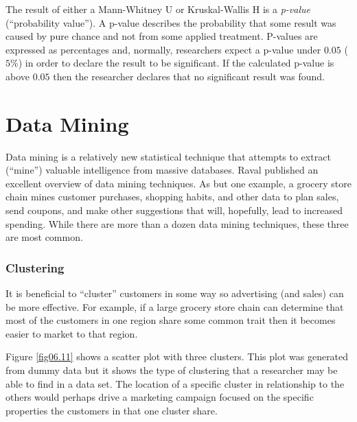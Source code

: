 The result of either a Mann-Whitney U or Kruskal-Wallis H is a \textit{p-value} (``probability value''). A p-value describes the probability that some result was caused by pure chance and not from some applied treatment. P-values are expressed as percentages and, normally, researchers expect a p-value under $ 0.05 $ ($ 5\% $) in order to declare the result to be significant. If the calculated p-value is above $ 0.05 $ then the researcher declares that no significant result was found.

\section{Data Mining}

Data mining is a relatively new statistical technique that attempts to extract (``mine'') valuable intelligence from massive databases. Raval\cite{raval2012data} published an excellent overview of data mining techniques. As but one example, a grocery store chain mines customer purchases, shopping habits, and other data to plan sales, send coupons, and make other suggestions that will, hopefully, lead to increased spending. While there are more than a dozen data mining techniques, these three are most common.

\subsubsection{Clustering}

It is beneficial to ``cluster'' customers in some way so advertising (and sales) can be more effective. For example, if a large grocery store chain can determine that most of the customers in one region share some common trait then it becomes easier to market to that region.

Figure \ref{fig06.11} shows a scatter plot with three clusters. This plot was generated from dummy data but it shows the type of clustering that a researcher may be able to find in a data set. The location of a specific cluster in relationship to the others would perhaps drive a marketing campaign focused on the specific properties the customers in that one cluster share.

